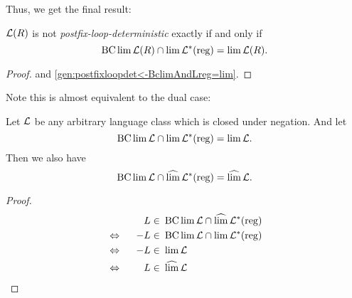 Thus, we get the final result: \\

\begin{mdframed}
\begin{theorem}
\label{gen:postfix-loop-det=limAndBclim}
$\mathcal{L}(R)$ is not \emph{postfix-loop-deterministic} exactly if and only if
\[ \operatorname{BC} \lim \mathcal{L}(R) \cap \lim \mathcal{L}^*(\textup{\textrm{reg}}) = \lim \mathcal{L}(R) . \]
\end{theorem}
\end{mdframed}
\begin{proof}
 and \cref{gen:postfixloopdet<-BclimAndLreg=lim}.
\end{proof}

Note this is almost equivalent to the dual case:
\begin{lemma}
\label{gen:limAndBclim:dual}
Let $\mathcal{L}$ be any arbitrary language class which is closed under negation. And let
\[ \operatorname{BC} \lim \mathcal{L} \cap \lim \mathcal{L}^*(\textup{\textrm{reg}}) = \lim \mathcal{L} . \]
Then we also have
\[ \operatorname{BC} \lim \mathcal{L} \cap \operatorname{\widehat{lim}} \mathcal{L}^*(\textup{\textrm{reg}}) = \operatorname{\widehat{lim}} \mathcal{L} . \]
\begin{proof}
\begin{alignat*}{3}
&& L \in & \ \operatorname{BC} \lim \mathcal{L} \cap \operatorname{\widehat{lim}} \mathcal{L}^*(\textup{\textrm{reg}}) \\
&\Leftrightarrow \ \ & -L \in & \ \operatorname{BC} \lim \mathcal{L} \cap \lim \mathcal{L}^*(\textup{\textrm{reg}}) \\
&\Leftrightarrow \ \ & -L \in & \ \lim \mathcal{L} \\
&\Leftrightarrow \ \ & L \in & \ \operatorname{\widehat{lim}} \mathcal{L}
\end{alignat*}
\end{proof}
\end{lemma}

%
%


